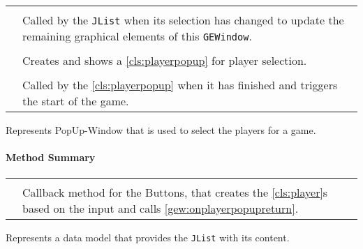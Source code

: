 \paragraph*{}
\begin{longtable}{Lp{10cm}}
	\startmethodtable
	 \\
	& Called by the \texttt{JList} when its selection has changed to update the remaining graphical elements of this \texttt{GEWindow}. \\
	 \\
	& Creates and shows a \ref{cls:playerpopup} for player selection. \\
	 \\
	& Called by the \ref{cls:playerpopup} when it has finished and triggers the start of the game. \\
	\hline
\end{longtable}

\pagebreak

Represents PopUp-Window that is used to select the players for a game. \\

\centerdash

\paragraph*{Method Summary}
\paragraph*{}
\begin{longtable}{Lp{10cm}}
	\startmethodtable
	 \\
	& Callback method for the Buttons, that creates the \ref{cls:player}s based on the input and calls \ref{gew:onplayerpopupreturn}. \\
	\hline
\end{longtable}

\pagebreak

Represents a data model that provides the \texttt{JList} with its content. \\

\centerdash

